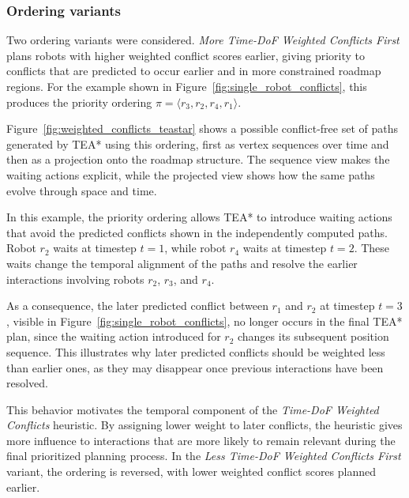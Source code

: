 \subsubsection{Ordering variants}
\label{subsubsec:time_dof_weighted_conflicts_ordering_variants}
\hspace{\parindent}
Two ordering variants were considered. \textit{More Time-DoF Weighted Conflicts First} plans robots
with higher weighted conflict scores earlier, giving priority to conflicts that are predicted to
occur earlier and in more constrained roadmap regions. For the example shown in
Figure~\ref{fig:single_robot_conflicts}, this produces the priority ordering
\(\pi = \langle r_3, r_2, r_4, r_1 \rangle\).

Figure~\ref{fig:weighted_conflicts_teastar} shows a possible conflict-free set of paths generated by
TEA* using this ordering, first as vertex sequences over time and then as a projection onto the
roadmap structure. The sequence view makes the waiting actions explicit, while the projected view
shows how the same paths evolve through space and time.

In this example, the priority ordering allows TEA* to introduce waiting actions that avoid the
predicted conflicts shown in the independently computed paths. Robot \(r_2\) waits at timestep
\(t=1\), while robot \(r_4\) waits at timestep \(t=2\). These waits change the temporal alignment of
the paths and resolve the earlier interactions involving robots \(r_2\), \(r_3\), and \(r_4\).

As a consequence, the later predicted conflict between \(r_1\) and \(r_2\) at timestep \(t=3\),
visible in Figure~\ref{fig:single_robot_conflicts}, no longer occurs in the final TEA* plan, since
the waiting action introduced for \(r_2\) changes its subsequent position sequence. This illustrates
why later predicted conflicts should be weighted less than earlier ones, as they may disappear once
previous interactions have been resolved.

This behavior motivates the temporal component of the \textit{Time-DoF Weighted Conflicts}
heuristic. By assigning lower weight to later conflicts, the heuristic gives more influence to
interactions that are more likely to remain relevant during the final prioritized planning process.
In the \textit{Less Time-DoF Weighted Conflicts First} variant, the ordering is reversed, with lower
weighted conflict scores planned earlier.

